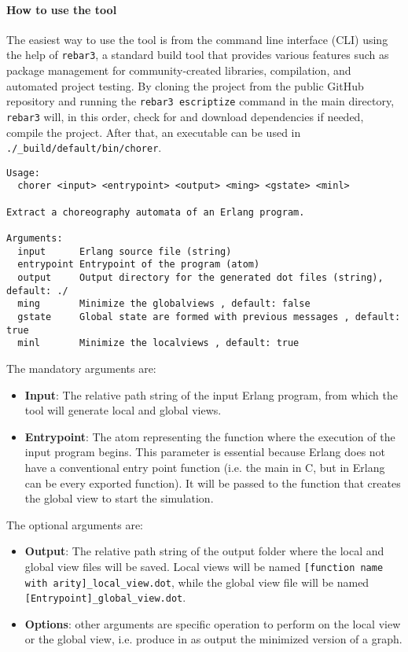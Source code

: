 \paragraph{How to use the tool}
The easiest way to use the tool is from the command line interface (CLI)
using the help of \texttt{rebar3}, a standard build tool that provides various features
such as package management for community-created libraries, compilation, and
automated project testing. By cloning the project from the public GitHub
repository and running the \texttt{rebar3 escriptize} command in the main
directory, \texttt{rebar3} will, in this order, check for and download
dependencies if needed, compile the project. After
that, an executable can be used in \texttt{./\_build/default/bin/chorer}.

\begin{lstlisting}[caption=Usage message]
Usage:
  chorer <input> <entrypoint> <output> <ming> <gstate> <minl>

Extract a choreography automata of an Erlang program.

Arguments:
  input      Erlang source file (string)
  entrypoint Entrypoint of the program (atom)
  output     Output directory for the generated dot files (string), default: ./
  ming       Minimize the globalviews , default: false
  gstate     Global state are formed with previous messages , default: true
  minl       Minimize the localviews , default: true
\end{lstlisting}

\noindent The mandatory arguments are:
\begin{itemize}
    \item \textbf{Input}: The relative path string of the input Erlang program,
    from which the tool will generate local and global views.
    \item \textbf{Entrypoint}: The atom representing the function where the
    execution of the input program begins. This parameter is essential because
    Erlang does not have a conventional entry point function (i.e. the main in C,
    but in Erlang can be every exported function). It will be passed to the
    function that creates the global view to start the simulation.
\end{itemize}

\noindent The optional arguments are:
\begin{itemize}
    \item \textbf{Output}: The relative path string of the output folder where
    the local and global view files will be saved. Local views will be named
    \texttt{[function name with arity]\_local\_view.dot}, while the global view
    file will be named \texttt{[Entrypoint]\_global\_view.dot}.
    \item \textbf{Options}: other arguments are specific operation to perform
    on the local view or the global view, i.e. produce in as output the
    minimized version of a graph.
\end{itemize}

